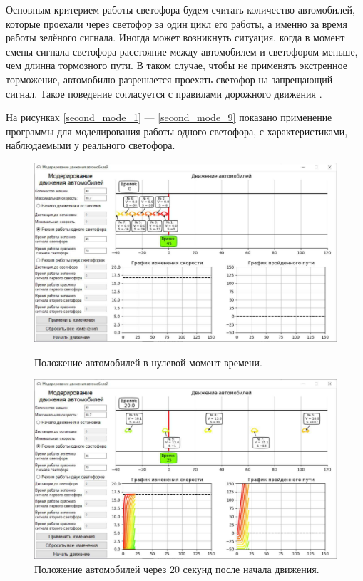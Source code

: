 \documentclass[12pt, a4paper]{extarticle}
\numberwithin{equation}{section}
\numberwithin{figure}{section}
\begin{document}
Основным критерием работы светофора будем считать количество автомобилей, которые проехали через светофор за один цикл его работы, а именно за время работы зелёного сигнала. Иногда может возникнуть ситуация, когда в момент смены сигнала светофора расстояние между автомобилем и светофором меньше, чем длинна тормозного пути. В таком случае, чтобы не применять экстренное торможение, автомобилю разрешается проехать светофор на запрещающий сигнал. Такое поведение согласуется с правилами дорожного движения \cite{PDD}.

На рисунках \ref{second_mode_1} --- \ref{second_mode_9} показано применение программы для моделирования работы одного светофора, с характеристиками, наблюдаемыми у реального светофора.

\begin{figure}[h!]
	\begin{center}
		\begin{minipage}[h]{0.48\linewidth}
			\includegraphics[width=1\linewidth]
			{Images/screens/second_mode_1}
			\caption{Положение автомобилей в нулевой момент времени.} 
			\label{second_mode_1}
		\end{minipage}
		\hfill 
		\begin{minipage}[h]{0.48\linewidth}
			\includegraphics[width=1\linewidth]
			{Images/screens/second_mode_2}
			\caption{Положение автомобилей через 20 секунд после начала движения.}
			\label{second_mode_2}
		\end{minipage}
	\end{center}
\end{figure}
\end{document}
